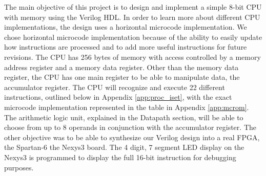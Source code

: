 The main objective of this project is to design and implement a simple 8-bit
CPU with memory using the Verilog HDL. In order to learn more about different
CPU implementations, the design uses a horizontal microcode implementation. We
chose horizontal microcode implementation because of the ability to easily
update how instructions are processed and to add more useful instructions for
future revisions. The CPU has 256 bytes of memory with access controlled by a
memory address register and a memory data register. Other than the memory data
register, the CPU has one main register to be able to manipulate data, the
accumulator register. The CPU will recognize and execute 22 different
instructions, outlined below in Appendix \ref{app:proc_iset}, with the exact
microcode implementation represented in the table in
Appendix \ref{app:mcrom}. The arithmetic logic unit, explained in the Datapath
section, will be able to choose from up to 8 operands in conjunction with the
accumulator register. The other objective was to be able to synthesize our
Verilog design into a real FPGA, the Spartan-6 the Nexys3 board. The 4 digit,
7 segment LED display on the Nexys3 is programmed to display the full 16-bit
instruction for debugging purposes.
